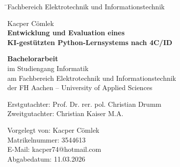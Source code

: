     \begin{titlepage}

	\thispagestyle{empty}

     \begin{tabbing}
\hspace{1cm} \= \small Fachbereich Elektrotechnik und Informationstechnik
\end{tabbing}

    \vspace{5cm}
	\centering \begin{minipage}[t]{17cm}

		\centering
        Kacper Cömlek\\
        \vspace{0.5cm}
        \large \textbf{Entwicklung und Evaluation eines\\KI-gestützten Python-Lernsystems nach 4C/ID}
		\medskip
	\end{minipage}

    \vspace{2cm}
	\begin{minipage}[t]{15cm}
	\centering \textbf{Bachelorarbeit} \\
		\centering \normalfont im Studiengang Informatik\\am Fachbereich Elektrotechnik und Informationstechnik\\der FH Aachen -- University of Applied Sciences
	\end{minipage}
	\vspace{7cm}

	\centering
	\begin{minipage}[b]{14cm} \normalfont
			\centering
                Erstgutachter:  Prof. Dr. rer. pol. Christian Drumm\\
                Zweitgutachter:  Christian Kaiser M.A.\\
	\end{minipage}

    \vspace{2cm}
	\centering
	\begin{minipage}[b]{12cm} \normalfont
			\centering
            Vorgelegt von: Kacper Cömlek\\
            Matrikelnummer: 3544613\\
            E-Mail: kacper74@hotmail.com\\
            Abgabedatum: 11.03.2026

	\end{minipage}

	\restoregeometry

\end{titlepage}
